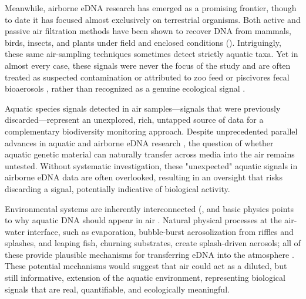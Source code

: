 \documentclass{article}
\begin{document}
Meanwhile, airborne eDNA research has emerged as a promising frontier, though to date it has focused almost exclusively on terrestrial organisms. Both active and passive air filtration methods have been shown to recover DNA from mammals, birds, insects, and plants under field and enclosed conditions (\cite{clare2021, garrett2023, johnson2019, johnson2023, lynggaard2024, roger2022, lynggaard2022}). Intriguingly, these same air-sampling techniques sometimes detect strictly aquatic taxa. Yet in almost every case, these signals were never the focus of the study and are often treated as suspected contamination or attributed to zoo feed or piscivores fecal bioaerosols \cite{sullivan2023, klepke2022, lynggaard2023, lynggaard2022}, rather than recognized as a genuine ecological signal \cite{tournayre2025}.

Aquatic species signals detected in air samples—signals that were previously discarded—represent an unexplored, rich, untapped source of data for a complementary biodiversity monitoring approach. Despite unprecedented parallel advances in aquatic and airborne eDNA research \cite{altermatt2025, klepke2022, johnson2024, lynggaard2023}, the question of whether aquatic genetic material can naturally transfer across media into the air remains untested. Without systematic investigation, these "unexpected" aquatic signals in airborne eDNA data are often overlooked, resulting in an oversight that risks discarding a signal, potentially indicative of biological activity. 

Environmental systems are inherently interconnected (\cite{folke2021}, and basic physics points to why aquatic DNA should appear in air \cite{monahan1986, seinfeld2016}. Natural physical processes at the air-water interface, such as evaporation, bubble-burst aerosolization from riffles and splashes, and leaping fish, churning substrates, create splash-driven aerosols; all of these provide plausible mechanisms for transferring eDNA into the atmosphere \cite{duchemin2002, mueller2008, stell2020, vandijk2003}. These potential mechanisms would suggest that air could act as a diluted, but still informative, extension of the aquatic environment, representing biological signals that are real, quantifiable, and ecologically meaningful.
\end{document}
